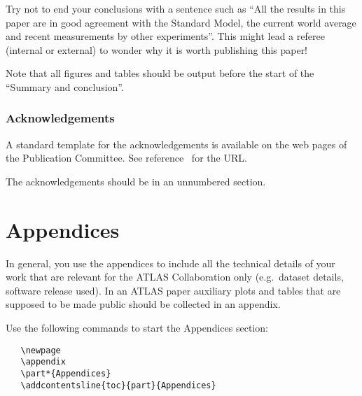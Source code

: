 \documentclass[UKenglish]{style/atlasdoc}
\begin{document}
Try not to end your conclusions with a sentence such as
``All the results in this paper are in good agreement with the
Standard Model, the current world average and recent
measurements by other experiments''. This might lead a referee
(internal or external) to wonder why it is worth publishing this
paper!

Note that all figures and tables should be output before the start of the
``Summary and conclusion''. 


\section*{Acknowledgements}
\label{sec:acknowldge}

A standard template for the acknowledgements is available on the
web pages of the Publication Committee.
See reference~\cite{publication-policy} for the URL. 

The acknowledgements should be in an unnumbered section.


\printbibliography
% 
% 


\newpage
\appendix
\part*{Appendices}

In general, you use the appendices to include all the technical details of your work
that are relevant for the ATLAS Collaboration only (e.g.\ dataset details, software release used).
In an ATLAS paper auxiliary plots and tables that are supposed to be made public 
should be collected in an appendix.

Use the following commands to start the Appendices section:
\begin{verbatim}
   \newpage
   \appendix
   \part*{Appendices}
   \addcontentsline{toc}{part}{Appendices}
\end{verbatim}
\end{document}
